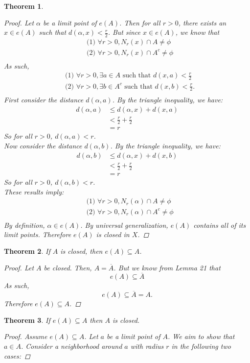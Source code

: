 \documentclass{amsart}
\newtheorem{theorem}{Theorem}
\begin{document}
\begin{enumerate}[1.]
\begin{theorem}
\begin{proof}
		Let $\alpha$ be a limit point of $e(A)$. Then for all $r > 0$, there exists an $x \in e(A)$ such that
		$d(\alpha, x) < \frac{r}{2}$. But since $x \in e(A)$, we know that
		\begin{align*}
			&\text{(1) } \forall r > 0, N_r(x) \cap A \neq \phi \\
			&\text{(2) } \forall r > 0, N_r(x) \cap A^c \neq \phi \\
		\end{align*}
		As such,
		\begin{align*}
			&\text{(1) } \forall r > 0, \exists a \in A \text{ such that } d(x, a) < \frac{r}{2} \\
			&\text{(2) } \forall r > 0, \exists b \in A^c \text{ such that } d(x, b) < \frac{r}{2}. \\
		\end{align*}
		First consider the distance $d(\alpha, a)$. By the triangle inequality, we have:
		\begin{align*}
			d(\alpha, a) &\leq d(\alpha, x) + d(x,a) \\
			&< \frac{r}{2} + \frac{r}{2} \\
			&= r
		\end{align*}
		So for all $r > 0$, $d(\alpha, a) < r$. \\
		Now consider the distance $d(\alpha, b)$. By the triangle inequality, we have:
		\begin{align*}
			d(\alpha, b) &\leq d(\alpha, x) + d(x,b) \\
			&< \frac{r}{2} + \frac{r}{2} \\
			&= r
		\end{align*}
		So for all $r > 0$, $d(\alpha, b) < r$. \\
		These results imply:
		\begin{align*}
			&\text{(1) } \forall r > 0, N_r(\alpha) \cap A \neq \phi \\
			&\text{(2) } \forall r > 0, N_r(\alpha) \cap A^c \neq \phi \\
		\end{align*}
		By definition, $\alpha \in e(A)$. By universal generalization, $e(A)$ contains all of its limit points.
		Therefore $e(A)$ is closed in $X$.
	\end{proof}
\end{theorem}
\newpage
\begin{theorem}
	If $A$ is closed, then $e(A) \subseteq A$.
	\begin{proof}
		Let $A$ be closed. Then, $A = \overline{A}$.
		But we know from Lemma 21 that 
		\[
			e(A) \subseteq \overline{A}	
		\]
		As such,
		\[
			e(A) \subseteq \overline{A} = A.
		\]
		Therefore $e(A) \subseteq A$.
	\end{proof}
\end{theorem}
\begin{theorem}
	If $e(A) \subseteq A$ then $A$ is closed.
	\begin{proof}
		Assume $e(A) \subseteq A$.
		Let $a$ be a limit point of $A$. We aim to show that $a \in A$.
		Consider a neighborhood around $a$ with radius $r$ in the following two cases:


\end{proof}
\end{theorem}
\end{enumerate}
\end{document}
